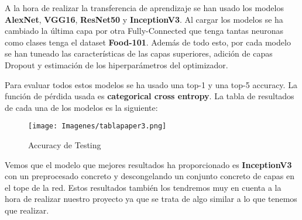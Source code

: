 \vspace{3 mm}

A la hora de realizar la transferencia de aprendizaje se han usado los modelos \textbf{AlexNet}, \textbf{VGG16}, \textbf{ResNet50} y \textbf{InceptionV3}. Al cargar los modelos se ha cambiado la última capa por otra Fully-Connected que tenga tantas neuronas como clases tenga el dataset \textbf{Food-101}. Además de todo esto, por cada modelo se han tuneado las características de las capas superiores, adición de capas Dropout y estimación de los hiperparámetros del optimizador.

\vspace{3 mm}

Para evaluar todos estos modelos se ha usado una top-1 y una top-5 accuracy. La función de pérdida usada es \textbf{categorical cross entropy}. La tabla de resultados de cada una de los modelos es la siguiente:

\vspace{5 mm}

\begin{figure}[H]
  \centering
  \texttt{[image: Imagenes/tablapaper3.png]}
  \caption{Accuracy de Testing}
  \label{fig:sub-first}
\end{figure}

\vspace{5 mm}

Vemos que el modelo que mejores resultados ha proporcionado es \textbf{InceptionV3} con un preprocesado concreto y descongelando un conjunto concreto de capas en el tope de la red. Estos resultados también los tendremos muy en cuenta a la hora de realizar nuestro proyecto ya que se trata de algo similar a lo que tenemos que realizar.
